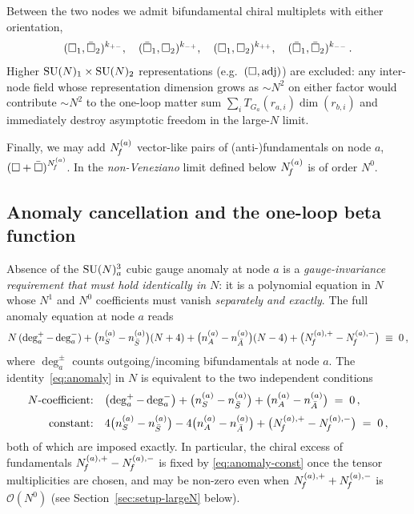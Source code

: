 Between the two nodes we admit bifundamental chiral multiplets with
either orientation,
\begin{equation}
  (\square_{1},\bar{\square}_{2})^{k_{+-}},
  \quad
  (\bar{\square}_{1},\square_{2})^{k_{-+}},
  \quad
  (\square_{1},\square_{2})^{k_{++}},
  \quad
  (\bar{\square}_{1},\bar{\square}_{2})^{k_{--}}\,.
\end{equation}
Higher $\mathrm{SU}(N)_{1}\times\mathrm{SU}(N)_{2}$ representations
(e.g.\ $(\square,\mathrm{adj})$) are excluded: any inter-node field whose
representation dimension grows as $\sim N^{2}$ on either factor would
contribute $\sim N^{2}$ to the one-loop matter sum
$\sum_{i}T_{G_{a}}(r_{a,i})\dim(r_{b,i})$ and immediately destroy
asymptotic freedom in the large-$N$ limit.

Finally, we may add $N_{\!f}^{(a)}$ vector-like pairs of (anti-)fundamentals
on node $a$, $(\square+\bar{\square})^{N_{\!f}^{(a)}}$.  In the \emph{non-Veneziano}
limit defined below $N_{\!f}^{(a)}$ is of order $N^{0}$.

\subsection{Anomaly cancellation and the one-loop beta function}
\label{sec:setup-beta}

Absence of the $\mathrm{SU}(N)^{3}_{a}$ cubic gauge anomaly at node $a$ is a
\emph{gauge-invariance requirement that must hold identically in
$N$}: it is a polynomial equation in $N$ whose $N^{1}$ and $N^{0}$
coefficients must vanish \emph{separately and exactly}.  The full
anomaly equation at node $a$ reads
\begin{equation}
  N\,(\deg^{+}_{a}-\deg^{-}_{a})
  +\bigl(n_{S}^{(a)}-n_{\bar S}^{(a)}\bigr)(N+4)
  +\bigl(n_{A}^{(a)}-n_{\bar A}^{(a)}\bigr)(N-4)
  +\bigl(N_{\!f}^{(a),+}-N_{\!f}^{(a),-}\bigr)\;\equiv\;0\,,
  \label{eq:anomaly}
\end{equation}
where $\deg^{\pm}_{a}$ counts outgoing/incoming bifundamentals at
node $a$.  The identity~\eqref{eq:anomaly} in $N$ is equivalent to
the two independent conditions
\begin{align}
  \text{$N$-coefficient:} \quad
  &\bigl(\deg^{+}_{a}-\deg^{-}_{a}\bigr)
   +\bigl(n_{S}^{(a)}-n_{\bar S}^{(a)}\bigr)
   +\bigl(n_{A}^{(a)}-n_{\bar A}^{(a)}\bigr)\;=\;0\,,
   \label{eq:anomaly-N}\\[2pt]
  \text{constant:} \quad
  &4\bigl(n_{S}^{(a)}-n_{\bar S}^{(a)}\bigr)
   -4\bigl(n_{A}^{(a)}-n_{\bar A}^{(a)}\bigr)
   +\bigl(N_{\!f}^{(a),+}-N_{\!f}^{(a),-}\bigr)\;=\;0\,,
   \label{eq:anomaly-const}
\end{align}
both of which are imposed exactly.  In particular, the chiral excess
of fundamentals $N_{\!f}^{(a),+}-N_{\!f}^{(a),-}$ is fixed by
\eqref{eq:anomaly-const} once the tensor multiplicities are chosen,
and may be non-zero even when $N_{\!f}^{(a),+}+N_{\!f}^{(a),-}$ is
$\mathcal O(N^{0})$ (see Section~\ref{sec:setup-largeN} below).

